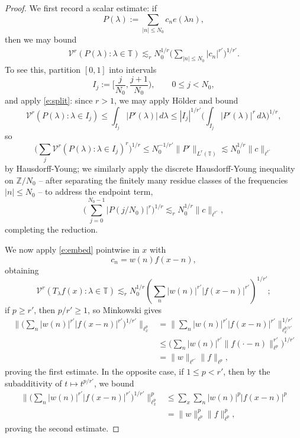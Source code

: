 \documentclass[12pt]{amsart}
\numberwithin{equation}{section}
\theoremstyle{definition}
\begin{document}
\begin{proof}
We first record a scalar estimate: if
\[
    P(\lambda):=\sum_{|n|\leq N_0} c_n e(\lambda n),
\]
then we may bound
\begin{align}\label{e:embed}
    \mathcal V^r(P(\lambda) : \lambda \in \mathbb{T})
    \lesssim_r
    N_0^{1/r}
    \big(\sum_{|n|\leq N_0}|c_n|^{r'}\big)^{1/r'}.
\end{align}
To see this, partition \([0,1]\) into intervals
\[
    I_j:=[\frac{j}{N_0},\frac{j+1}{N_0}),
    \qquad 0\leq j<N_0,
\]
and apply \eqref{e:split}: since \(r>1\), we may apply H\"{o}lder and bound
\[
    \mathcal V^r(P(\lambda): \lambda \in I_j)\leq \int_{I_j}|P'(\lambda)|\,d\lambda \leq
    |I_j|^{1/r'}
    \big(\int_{I_j}|P'(\lambda)|^r\,d\lambda\big)^{1/r},
\]
so 
\[
    \big(
    \sum_j \mathcal V^r(P(\lambda): \lambda \in I_j)^r
    \big)^{1/r}
    \leq
    N_0^{-1/r'}\|P'\|_{L^r(\mathbb T)} \lesssim N_0^{1/r} \| c \|_{\ell^{r'}}
\]
by Hausdorff-Young; we similarly apply the discrete Hausdorff-Young inequality on \(\mathbb Z/N_0\) -- after separating the
finitely many residue classes of the frequencies \(|n|\leq N_0\) -- to address the endpoint term,
\[
    \big(\sum_{j=0}^{N_0-1}|P(j/N_0)|^r\big)^{1/r}
    \lesssim_r
    N_0^{1/r}
    \|c\|_{\ell^{r'}},
\]
completing the reduction.

We now apply \eqref{e:embed} pointwise in \(x\) with
\[
    c_n=w(n)f(x-n),
\]
obtaining
\[
    \mathcal V^r(T_\lambda f(x) : \lambda \in \mathbb{T})
    \lesssim_r
    N_0^{1/r}
    \left(
    \sum_n |w(n)|^{r'}|f(x-n)|^{r'}
    \right)^{1/r'};
\]
if \(p\geq r'\), then \(p/r'\geq1\), so Minkowski gives
\begin{align}
    \Big\|
    \big(
    \sum_n |w(n)|^{r'}|f(x-n)|^{r'}
    \big)^{1/r'}
    \Big\|_{\ell^p_x}
    &=
    \big\|
    \sum_n |w(n)|^{r'}|f(x-n)|^{r'}
    \big\|_{\ell^{p/r'}_x}^{1/r'}  \\
    &\leq
    \big(
    \sum_n |w(n)|^{r'}\|f(\cdot-n)\|_{\ell^p}^{r'}
    \big)^{1/r'}  \\
    &=
    \|w\|_{\ell^{r'}}\|f\|_{\ell^p},
\end{align}
proving the first estimate. In the opposite case, if \(1\leq p<r'\), then by the subadditivity of \(t\mapsto t^{p/r'}\), we bound
\begin{align}
    \Big\|
    \big(
    \sum_n |w(n)|^{r'}|f(x-n)|^{r'}
    \big)^{1/r'}
    \Big\|_{\ell^p_x}^p
    &\leq
    \sum_x\sum_n |w(n)|^p|f(x-n)|^p   \\
    &=
    \|w\|_{\ell^p}^p\|f\|_{\ell^p}^p,
\end{align}
proving the second estimate.
\end{proof}
\end{document}
